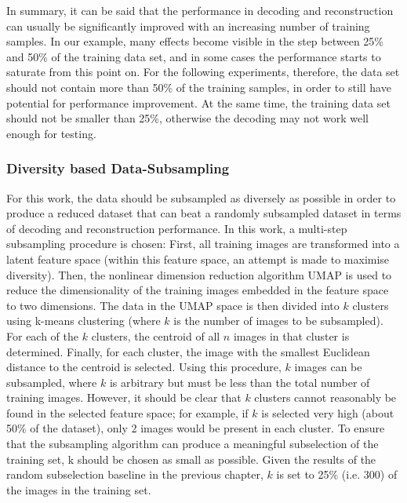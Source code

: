 In summary, it can be said that the performance in decoding and reconstruction can usually be significantly improved with an increasing number of training samples. In our example, many effects become visible in the step between 25\% and 50\% of the training data set, and in some cases the performance starts to saturate from this point on. For the following experiments, therefore, the data set should not contain more than 50\% of the training samples, in order to still have potential for performance improvement. At the same time, the training data set should not be smaller than 25\%, otherwise the decoding may not work well enough for testing.

\subsubsection{Diversity based Data-Subsampling}

For this work, the data should be subsampled as diversely as possible in order to produce a reduced dataset that can beat a randomly subsampled dataset in terms of decoding and reconstruction performance. In this work, a multi-step subsampling procedure is chosen: First, all training images are transformed into a latent feature space (within this feature space, an attempt is made to maximise diversity). Then, the nonlinear dimension reduction algorithm UMAP\cite{mcinnesUMAPUniformManifold2018} is used to reduce the dimensionality of the training images embedded in the feature space to two dimensions. The data in the UMAP space is then divided into $k$ clusters using k-means\cite{1056489} clustering (where $k$ is the number of images to be subsampled). For each of the $k$ clusters, the centroid of all $n$ images in that cluster is determined. Finally, for each cluster, the image with the smallest Euclidean distance to the centroid is selected. Using this procedure, $k$ images can be subsampled, where $k$ is arbitrary but must be less than the total number of training images. However, it should be clear that $k$ clusters cannot reasonably be found in the selected feature space; for example, if $k$ is selected very high (about 50\% of the dataset), only 2 images would be present in each cluster. To ensure that the subsampling algorithm can produce a meaningful subselection of the training set, k should be chosen as small as possible. Given the results of the random subselection baseline in the previous chapter, $k$ is set to 25\% (i.e. 300) of the images in the training set. 

